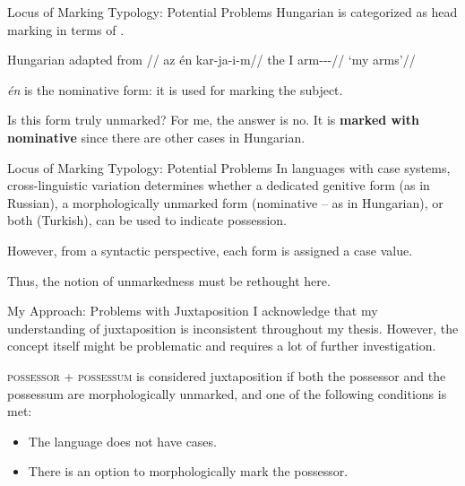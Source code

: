 \documentclass[12pt,aspectratio=169,t]{beamer}
\renewcommand{\'}{\textquotesingle}
\begin{document}
\begin{frame}{Locus of Marking Typology: Potential Problems}
	Hungarian is categorized as head marking in terms of \cite{nichols_locus_2013}.
	
	\ex
	\begingl
	\glpreamble Hungarian adapted from \cite[263]{szabolcsi1981possessive}//
	\gla az én kar-ja-i-m//
	\glb the I arm-\Poss-\Pl-\Fsg//
	\glft `my arms'//
	\endgl
	\xe
	
	\pause
	\textit{én} is the nominative form: it is used for marking the subject.
	
	\pause
	Is this form truly unmarked? For me, the answer is no. It is \textbf{marked with nominative} since there are other cases in Hungarian.
\end{frame}

\begin{frame}{Locus of Marking Typology: Potential Problems}
	In languages with case systems, cross-linguistic variation determines whether a dedicated genitive form (as in Russian), a morphologically unmarked form (nominative -- as in Hungarian), or both (Turkish), can be used to indicate possession.
	
	However, from a syntactic perspective, each form is assigned a case value.
	
	\pause
	Thus, the notion of unmarkedness must be rethought here.
\end{frame}

\begin{frame}{My Approach: Problems with Juxtaposition}
	I acknowledge that my understanding of juxtaposition is inconsistent throughout my thesis. However, the concept itself might be problematic and requires a lot of further investigation.
	
	\textsc{possessor + possessum} is considered juxtaposition if both the possessor and the possessum are morphologically unmarked, and one of the following conditions is met:
	
	\begin{itemize}
		\item The language does not have cases.
		\item There is an option to morphologically mark the possessor.
	\end{itemize}
	
\end{frame}
\end{document}
